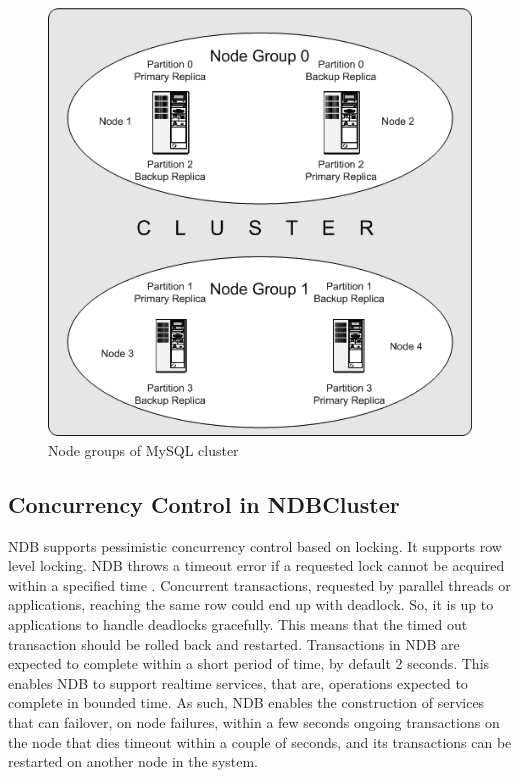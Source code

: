 \begin{figure}
\centering  
 \includegraphics[scale=0.4]{figs/preliminar/nodegroups.png}
  \caption{Node groups of MySQL cluster}
  \label{fig:nodegroups}
\end{figure}

\subsection{Concurrency Control in NDBCluster}
NDB  supports   pessimistic   concurrency   control  based  on  locking.  It  supports   row  level
locking.  NDB  throws   a timeout error if a requested lock  cannot be acquired within a specified
time \cite{mysql1}.  Concurrent  transactions,  requested  by   parallel  threads   or  applications,
reaching  the  same  row  could  end  up  with  deadlock.  So,  it  is   up  to  applications   to  handle
deadlocks   gracefully.  This   means   that  the  timed  out  transaction  should  be  rolled  back   and
restarted.  Transactions   in  NDB  are  expected  to  complete  within  a  short  period  of  time,  by
default  2  seconds.  This   enables   NDB  to  support  realtime  services,  that  are,  operations
expected  to  complete  in  bounded  time.  As   such,  NDB  enables   the  construction  of  services
that  can  failover,  on  node  failures,  within  a  few  seconds     ongoing transactions  on the node
that  dies  timeout within a couple of seconds, and its  transactions  can be restarted on another
node in the system.

